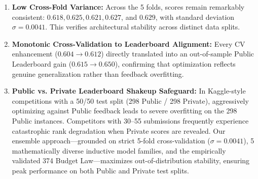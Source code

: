 \begin{enumerate}

  \item \textbf{Low Cross-Fold Variance:} Across the 5 folds, scores remain remarkably consistent: $0.618, 0.625, 0.621, 0.627$, and $0.629$, with standard deviation $\sigma = 0.0041$. This verifies architectural stability across distinct data splits.

  \item \textbf{Monotonic Cross-Validation to Leaderboard Alignment:} Every CV enhancement ($0.604 \to 0.612$) directly translated into an out-of-sample Public Leaderboard gain ($0.615 \to 0.650$), confirming that optimization reflects genuine generalization rather than feedback overfitting.

  \item \textbf{Public vs. Private Leaderboard Shakeup Safeguard:} In Kaggle-style competitions with a 50/50 test split (298 Public / 298 Private), aggressively optimizing against Public feedback leads to severe overfitting on the 298 Public instances. Competitors with 30--55 submissions frequently experience catastrophic rank degradation when Private scores are revealed. Our ensemble approach—grounded on strict 5-fold cross-validation ($\sigma = 0.0041$), 5 mathematically diverse inductive model families, and the empirically validated 374 Budget Law—maximizes out-of-distribution stability, ensuring peak performance on both Public and Private test splits.

\end{enumerate}

